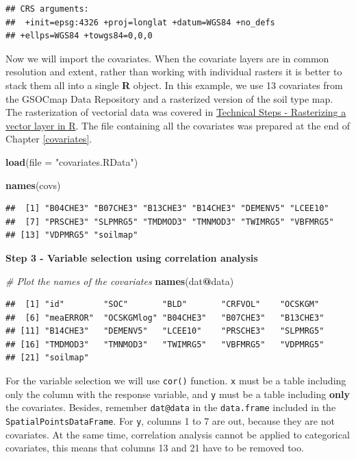 \documentclass[10pt,b5paper,]{book}
\newenvironment{Shaded}{\begin{snugshade}}{\end{snugshade}}
\newcommand{\CommentTok}[1]{\textcolor[rgb]{0.56,0.35,0.01}{\textit{#1}}}
\newcommand{\DataTypeTok}[1]{\textcolor[rgb]{0.13,0.29,0.53}{#1}}
\newcommand{\KeywordTok}[1]{\textcolor[rgb]{0.13,0.29,0.53}{\textbf{#1}}}
\newcommand{\NormalTok}[1]{#1}
\newcommand{\OperatorTok}[1]{\textcolor[rgb]{0.81,0.36,0.00}{\textbf{#1}}}
\newcommand{\StringTok}[1]{\textcolor[rgb]{0.31,0.60,0.02}{#1}}
\theoremstyle{definition}
\theoremstyle{definition}
\theoremstyle{definition}
\theoremstyle{remark}
\begin{document}
\begin{verbatim}
## CRS arguments:
##  +init=epsg:4326 +proj=longlat +datum=WGS84 +no_defs
## +ellps=WGS84 +towgs84=0,0,0
\end{verbatim}

Now we will import the covariates. When the covariate layers are in
common resolution and extent, rather than working with individual
rasters it is better to stack them all into a single \textbf{R} object.
In this example, we use 13 covariates from the GSOCmap Data Repository
and a rasterized version of the soil type map. The rasterization of
vectorial data was covered in
\protect\hyperlink{technical-steps---rasterizing-a-vector-layer-in-r}{Technical
Steps - Rasterizing a vector layer in R}. The file containing all the
covariates was prepared at the end of Chapter \ref{covariates}.

\begin{Shaded}
\begin{Highlighting}[]
\KeywordTok{load}\NormalTok{(}\DataTypeTok{file =} \StringTok{"covariates.RData"}\NormalTok{)}

\KeywordTok{names}\NormalTok{(covs)}
\end{Highlighting}
\end{Shaded}

\begin{verbatim}
##  [1] "B04CHE3" "B07CHE3" "B13CHE3" "B14CHE3" "DEMENV5" "LCEE10" 
##  [7] "PRSCHE3" "SLPMRG5" "TMDMOD3" "TMNMOD3" "TWIMRG5" "VBFMRG5"
## [13] "VDPMRG5" "soilmap"
\end{verbatim}

\textbf{Step 3 - Variable selection using correlation analysis}

\begin{Shaded}
\begin{Highlighting}[]
\CommentTok{# Plot the names of the covariates}
\KeywordTok{names}\NormalTok{(dat}\OperatorTok{@}\NormalTok{data)}
\end{Highlighting}
\end{Shaded}

\begin{verbatim}
##  [1] "id"        "SOC"       "BLD"       "CRFVOL"    "OCSKGM"   
##  [6] "meaERROR"  "OCSKGMlog" "B04CHE3"   "B07CHE3"   "B13CHE3"  
## [11] "B14CHE3"   "DEMENV5"   "LCEE10"    "PRSCHE3"   "SLPMRG5"  
## [16] "TMDMOD3"   "TMNMOD3"   "TWIMRG5"   "VBFMRG5"   "VDPMRG5"  
## [21] "soilmap"
\end{verbatim}

For the variable selection we will use \texttt{cor()} function.
\texttt{x} must be a table including only the column with the response
variable, and \texttt{y} must be a table including \textbf{only} the
covariates. Besides, remember \texttt{dat@data} in the
\texttt{data.frame} included in the \texttt{SpatialPointsDataFrame}. For
\texttt{y}, columns 1 to 7 are out, because they are not covariates. At
the same time, correlation analysis cannot be applied to categorical
covariates, this means that columns 13 and 21 have to be removed too.
\end{document}
